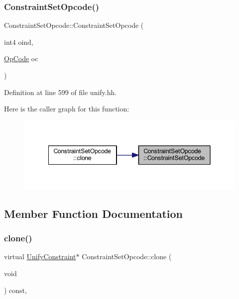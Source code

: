\subsubsection{\texorpdfstring{ConstraintSetOpcode()}{ConstraintSetOpcode()}}
{\footnotesize\ttfamily Constraint\+Set\+Opcode\+::\+Constraint\+Set\+Opcode (\begin{DoxyParamCaption}\item[{int4}]{oind,  }\item[{\mbox{\hyperlink{opcodes_8hh_abeb7dfb0e9e2b3114e240a405d046ea7}{Op\+Code}}}]{oc }\end{DoxyParamCaption})\hspace{0.3cm}{\ttfamily [inline]}}



Definition at line 599 of file unify.\+hh.

Here is the caller graph for this function\+:
\nopagebreak
\begin{figure}[H]
\begin{center}
\leavevmode
\includegraphics[width=342pt]{class_constraint_set_opcode_a9850af340e26bb441e8928a9d8932cdd_icgraph}
\end{center}
\end{figure}


\subsection{Member Function Documentation}
\mbox{\label{class_constraint_set_opcode_a619038e1115459c881218dce94f186d8}} 
\subsubsection{\texorpdfstring{clone()}{clone()}}
{\footnotesize\ttfamily virtual \mbox{\hyperlink{class_unify_constraint}{Unify\+Constraint}}$\ast$ Constraint\+Set\+Opcode\+::clone (\begin{DoxyParamCaption}\item[{void}]{ }\end{DoxyParamCaption}) const\hspace{0.3cm}{\ttfamily [inline]}, {\ttfamily [virtual]}}



